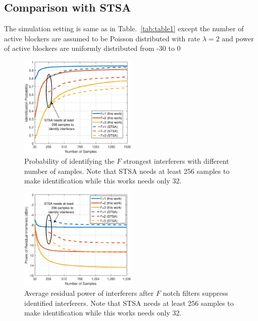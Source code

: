 \documentclass{IEEEtran}
\begin{document}
\subsection{Comparison with STSA}
The simulation setting is same as in Table.~\ref{tab:table1} except the number of active blockers are assumed to be Poisson distributed with rate $\lambda=2$ and power of active blockers are uniformly distributed from -30 to 0 


\begin{figure}
\begin{center}
\includegraphics[width=0.5\textwidth]{figure/comparison_STSA_prob1}
\end{center}
\caption{Probability of identifying the $F$ strongest interferers with different number of samples. Note that STSA needs at least 256 samples to make identification while this works needs only 32.}
\label{fig:sim_vs_theo3}
\end{figure}

\begin{figure}
\begin{center}
\includegraphics[width=0.5\textwidth]{figure/comparison_STSA_resd}
\end{center}
\caption{Average residual power of interferers after $F$ notch filters suppress identified interferers. Note that STSA needs at least 256 samples to make identification while this works needs only 32.}
\label{fig:sim_vs_theo2}
\end{figure}
%
%
\end{document}
